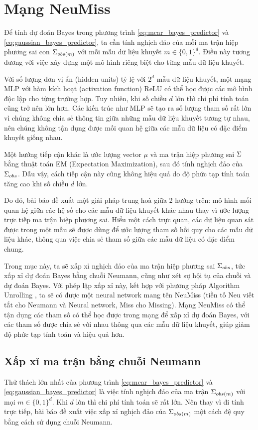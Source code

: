 \section{Mạng NeuMiss}

Để tính dự đoán Bayes trong phương trình \eqref{eq:mcar_bayes_predictor} và \eqref{eq:gaussian_bayes_predictor}, ta cần tính nghịch đảo của mỗi ma trận hiệp phương sai con $\Sigma_{obs(m)}$ với mỗi mẫu dữ liệu khuyết $m \in \{0,1\}^d$. Điều này tương đương với việc xây dựng một mô hình riêng biệt cho từng mẫu dữ liệu khuyết.

Với số lượng đơn vị ẩn (hidden units) tỷ lệ với $2^d$ mẫu dữ liệu khuyết, một mạng MLP với hàm kích hoạt (activation function) ReLU có thể học được các mô hình độc lập cho từng trường hợp. 
Tuy nhiên, khi số chiều $d$ lớn thì chi phí tính toán cũng trở nên lớn hơn. Các kiến trúc như MLP sẽ tạo ra số lượng tham số rất lớn vì chúng không chia sẻ thông tin giữa những mẫu dữ liệu khuyết tương tự nhau, nên chúng không tận dụng được mối quan hệ giữa các mẫu dữ liệu có đặc điểm khuyết giống nhau.

Một hướng tiếp cận khác là ước lượng vector $\mu$ và ma trận hiệp phương sai $\Sigma$ bằng thuật toán EM (Expectation Maximization), sau đó tính nghịch đảo của $\Sigma_{obs}$. Dẫu vậy, cách tiếp cận này cũng không hiệu quả do độ phức tạp tính toán tăng cao khi số chiều $d$ lớn.

Do đó, bài báo \cite{le2020neumiss} đề xuất một giải pháp trung hoà giữa 2 hướng trên: mô hình mối quan hệ giữa các hệ số cho các mẫu dữ liệu khuyết khác nhau thay vì ước lượng trực tiếp ma trận hiệp phương sai. Hiểu một cách trực quan, các dữ liệu quan sát được trong một mẫu sẽ được dùng để ước lượng tham số hồi quy cho các mẫu dữ liệu khác, thông qua việc chia sẻ tham số giữa các mẫu dữ liệu có đặc điểm chung. 

Trong mục này, ta sẽ xấp xỉ nghịch đảo của ma trận hiệp phương sai $\Sigma_{obs}$, tức xấp xỉ dự đoán Bayes bằng chuỗi Neumann, cũng như xét sự hội tụ của chuỗi và dự đoán Bayes. Với phép lặp xấp xỉ này, kết hợp với phương pháp Algorithm Unrolling \cite{gregor2010unroll}, ta sẽ có được một neural network mang tên NeuMiss (tiền tố Neu viết tắt cho Neumann và Neural network, Miss cho Missing). Mạng NeuMiss có thể tận dụng các tham số có thể học được trong mạng để xấp xỉ dự đoán Bayes, với các tham số được chia sẻ với nhau thông qua các mẫu dữ liệu khuyết, giúp giảm độ phức tạp tính toán và hiệu quả hơn.


\subsection{Xấp xỉ ma trận bằng chuỗi Neumann}
Thử thách lớn nhất của phương trình \eqref{eq:mcar_bayes_predictor} và \eqref{eq:gaussian_bayes_predictor} là việc tính nghịch đảo của ma trận $\Sigma_{obs(m)}$ với mọi $m \in \{0,1\}^d$. Khi $d$ lớn thì chi phí tính toán sẽ rất lớn.
Nên thay vì đi tính trực tiếp, bài báo đề xuất việc xấp xỉ nghịch đảo của $\Sigma_{obs(m)}$ một cách đệ quy bằng cách sử dụng chuỗi Neumann.

